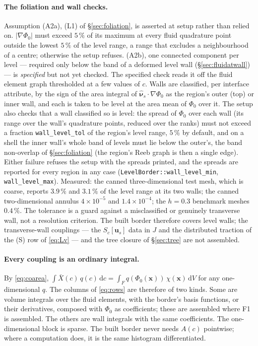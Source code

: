 \documentclass[11pt]{article}
\theoremstyle{definition}
\theoremstyle{remark}
\newcommand{\bu}{\mathbf{u}}
\newcommand{\bx}{\mathbf{x}}
\newcommand{\dV}{\,\mathrm{d}V}
\newcommand{\dc}{\,\mathrm{d}c}
\newcommand{\code}[1]{\texttt{#1}}
\newcommand{\nuhs}{\hat{\boldsymbol{\nu}}_s}
\begin{document}
\paragraph{The foliation and wall checks.} Assumption (A2a), (L1) of
\S\ref{sec:foliation}, is asserted at setup rather than relied on.
$|\nabla\Phi_0|$ must exceed $5\,\%$ of its maximum at every fluid
quadrature point outside the lowest $5\,\%$ of the level range, a range
that excludes a neighbourhood of a centre; otherwise the setup refuses.
(A2b), one connected component per level --- required only below the
band of a deformed level wall (\S\ref{sec:fluidatwall}) --- is
\emph{specified} but not yet checked. The specified check reads it off
the fluid element graph thresholded at a few values of $c$. Walls are
classified, per interface attribute, by the sign of the area integral
of $\nuhs\cdot\nabla\Phi_0$ as the region's outer (top) or inner wall,
and each is taken to be level at the area mean of $\Phi_0$ over it.
The setup also checks that a wall classified so
is level: the spread of $\Phi_0$ over each wall (its range over the
wall's quadrature points, reduced over the ranks) must not exceed a
fraction \code{wall\_level\_tol} of the region's level range, $5\,\%$
by default, and on a shell the inner wall's whole band of levels must
lie below the outer's, the band non-overlap of \S\ref{sec:foliation}
(the region's Reeb graph is then a single edge). Either failure refuses
the setup with the spreads printed, and the spreads are reported for
every region in any case (\code{LevelBorder::wall\_level\_min},
\code{wall\_level\_max}). Measured: the canned three-dimensional test
mesh, which is coarse, reports $3.9\,\%$ and $3.1\,\%$ of the level
range at its two walls; the canned two-dimensional annulus
$4\times10^{-5}$ and $1.4\times10^{-4}$; the $h = 0.3$ benchmark
meshes $0.4\,\%$. The tolerance is a guard against a misclassified or
genuinely transverse wall, not a resolution criterion. The built border therefore covers level
walls; the transverse-wall couplings --- the $S_c[\bu_s]$ data in $J$
and the distributed traction of the (S) row of \eqref{eq:Lv} --- and
the tree closure of \S\ref{sec:tree} are not assembled.

\paragraph{Every coupling is an ordinary integral.} By
\eqref{eq:coarea}, $\int\bar X(c)\,q(c)\dc = \int_F
q(\Phi_0(\bx))\,\chi(\bx)\dV$ for any one-dimensional $q$. The columns
of \eqref{eq:rows} are therefore of two kinds. Some are volume
integrals over the fluid elements, with the border's basis functions,
or their derivatives, composed with $\Phi_0$ as coefficients; these
are assembled where F1 is assembled. The others are wall integrals
with the same coefficients. The one-dimensional block is sparse.
The built border never needs $A(c)$ pointwise; where a computation
does, it is the same histogram differentiated.
\end{document}
